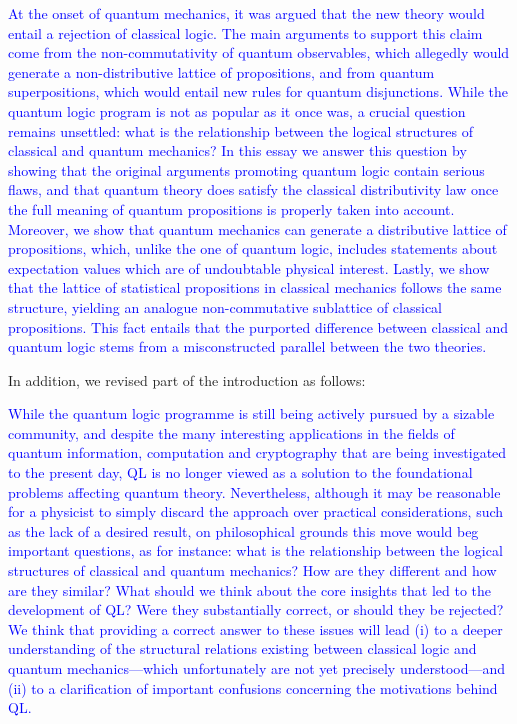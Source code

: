 \documentclass[11pt, executivepaper]{article}
\begin{document}
\begin{enumerate}
\textcolor{blue}{At the onset of quantum mechanics, it was argued that the new theory would entail a rejection of classical logic. The main arguments to support this claim come from the non-commutativity of quantum observables, which allegedly would generate a non-distributive lattice of propositions, and from quantum superpositions, which would entail new rules for quantum disjunctions. While the quantum logic program is not as popular as it once was, a crucial question remains unsettled: what is the relationship between the logical structures of classical and quantum mechanics? In this essay we answer this question by showing that the original arguments promoting quantum logic contain serious flaws, and that quantum theory does satisfy the classical distributivity law once the full meaning of quantum propositions is properly taken into account. Moreover, we show that quantum mechanics can generate a distributive lattice of propositions, which, unlike the one of quantum logic, includes statements about expectation values which are of undoubtable physical interest. Lastly, we show that the lattice of statistical propositions in classical mechanics follows the same structure, yielding an analogue non-commutative sublattice of classical propositions. This fact entails that the purported difference between classical and quantum logic stems from a misconstructed parallel between the two theories.}

In addition, we revised part of the introduction as follows:

\textcolor{blue}{While the quantum logic programme is still being actively pursued by a sizable community, and despite the many interesting applications in the fields of quantum information, computation and cryptography that are being investigated to the present day, QL is no longer viewed as a solution to the foundational problems affecting quantum theory. Nevertheless, although it may be reasonable for a physicist to simply discard the approach over practical considerations, such as the lack of a desired result, on philosophical grounds this move would beg important questions, as for instance: what is the relationship between the logical structures of classical and quantum mechanics? How are they different and how are they similar? What should we think about the core insights that led to the development of QL? Were they substantially correct, or should they be rejected? We think that providing a correct answer to these issues will lead (i) to a deeper understanding of the structural relations existing between classical logic and quantum mechanics---which unfortunately are not yet precisely understood---and (ii) to a clarification of important confusions concerning the motivations behind QL.}


\end{enumerate}
\end{document}
